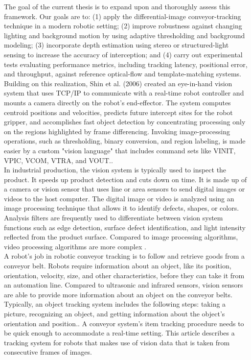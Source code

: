 \documentclass[12pt]{article}
\begin{document}
The goal of the current thesis is to expand upon and thoroughly assess this framework.  Our goals are to: (1) apply the differential-image conveyor-tracking technique in a modern robotic setting; (2) improve robustness against changing lighting and background motion by using adaptive thresholding and background modeling; (3) incorporate depth estimation using stereo or structured-light sensing to increase the accuracy of interception; and (4) carry out experimental tests evaluating performance metrics, including tracking latency, positional error, and throughput, against reference optical-flow and template-matching systems\cite{ref12}.\\

Building on this realization, Shin et al. (2006) created an eye-in-hand vision system that uses TCP/IP to communicate with a real-time robot controller and mounts a camera directly on the robot's end-effector.  The system computes centroid positions and velocities, predicts future intercept sites for the robot gripper, and accomplishes fast object detection by concentrating processing only on the regions highlighted by frame differencing.  Invoking image-processing operations, such as thresholding, binary conversion, and region labeling, is made easier by a custom "vision language" that includes command sets like VINIT, VPIC, VCOM, VTRA, and VOUT.\cite{ref12}.\\


In industrial production, the vision system is typically used to inspect the product.  It speeds up product detection and cuts down on time.  It is made up of a camera or vision sensor that uses line or area sensors to send digital images or videos to the host computer.  The digital image or video is analyzed using an image processing technique that allows it to identify defects, shapes, or colors.  Analysis filters are frequently used to differentiate between vision system functions such as edge detection, surface defect identification, and light intensity reflected from the product surface.  Compared to image processing algorithms, video processing algorithms are more complex \cite{ref12}.\\

A robot's job in robotic conveyor tracking is to follow and retrieve goods from a conveyor belt. Robots require information about an object, like its position, orientation, velocity, size, and other characteristics, before they can take it from an automation line. Compared to ultrasonic and infrared sensors, vision sensors are able to provide more information about an object on the conveyor belts. Typically, an object tracking system includes the following steps: taking a picture, recognizing an object, and getting information about the object's orientation and position.. A conveyor system's item tracking procedure needs to be quick enough to accommodate a real-time setting. This article describes a tracking system for robots that makes use of vision data that is taken from consecutive frames of images\cite{ref12}.\\
\end{document}
